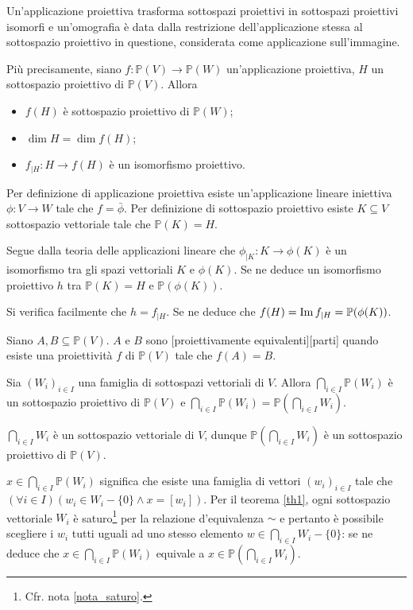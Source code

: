 \begin{Theorem}\label{th4}
	Un'applicazione proiettiva trasforma sottospazi proiettivi in sottospazi proiettivi isomorfi e un'omografia \`e data dalla restrizione dell'applicazione stessa al sottospazio proiettivo in questione, considerata come applicazione sull'immagine.
	\par Pi\`u precisamente, siano $f: \mathbb{P}(V) \rightarrow \mathbb{P}(W)$ un'applicazione proiettiva, $H$ un sottospazio proiettivo di $\mathbb{P}(V)$. Allora
	\begin{itemize}
		\item $f(H)$ \`e sottospazio proiettivo di $\mathbb{P}(W)$;
		\item $\dim H = \dim f(H)$;
		\item $f_{|H}: H \rightarrow f(H)$ \`e un isomorfismo proiettivo.
	\end{itemize}
\end{Theorem}
\Proof Per definizione di applicazione proiettiva esiste un'applicazione lineare iniettiva $\phi: V \rightarrow W$ tale che $f = \bar{\phi}$. Per definizione di sottospazio proiettivo esiste $K \subseteq V$ sottospazio vettoriale tale che $\mathbb{P}(K) = H$.
	\par Segue dalla teoria delle applicazioni lineare che $\phi_{|K}: K \rightarrow \phi(K)$ \`e un isomorfismo tra gli spazi vettoriali $K$ e $\phi(K)$. Se ne deduce un isomorfismo proiettivo $h$ tra $\mathbb{P}(K) = H$ e $\mathbb{P}(\phi(K))$.
	\par Si verifica facilmente che $h = f_{|H}$. Se ne deduce che $f(H) = \operatorname{Im} f_{|H} = \mathbb{P}(\phi(K))$. \EndProof
\begin{Definition}\label{def7}
	Siano $A, B \subseteq \mathbb{P}(V)$. $A$ e $B$ sono [proiettivamente equivalenti][parti] quando esiste una proiettivit\`a $f$ di $\mathbb{P}(V)$ tale che $f(A) = B$.
\end{Definition}
\begin{Theorem}\label{th5}
	Sia $(W_i)_{i \in I}$ una famiglia di sottospazi vettoriali di $V$. Allora $\bigcap_{i \in I} \mathbb{P}(W_i)$ \`e un sottospazio proiettivo di $\mathbb{P}(V)$ e $\bigcap_{i \in I} \mathbb{P}(W_i) = \mathbb{P}(\bigcap_{i \in I} W_i)$.
\end{Theorem}
\Proof $\bigcap_{i \in I} W_i$ \`e un sottospazio vettoriale di $V$, dunque $\mathbb{P}(\bigcap_{i \in I} W_i)$ \`e un sottospazio proiettivo di $\mathbb{P}(V)$.
	\par $x \in \bigcap_{i \in I} \mathbb{P}(W_i)$ significa che esiste una famiglia di vettori $(w_i)_{i \in I}$ tale che $(\forall i \in I)(w_i \in W_i - \lbrace 0 \rbrace \land x = [w_i])$. Per il teorema \ref{th1}, ogni sottospazio vettoriale $W_i$ \`e saturo\footnote{Cfr. nota \ref{nota_saturo}.} per la relazione d'equivalenza $\sim$ e pertanto \`e possibile scegliere i $w_i$ tutti uguali ad uno stesso elemento $w \in \bigcap_{i \in I} W_i - \lbrace 0 \rbrace$: se ne deduce che $x \in \bigcap_{i \in I} \mathbb{P}(W_i)$ equivale a $x \in \mathbb{P}(\bigcap_{i \in I} W_i)$. \EndProof
